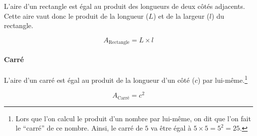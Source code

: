 \documentclass[a4paper, twoside]{article}
\begin{document}
L'aire d'un rectangle est égal au produit des longueurs de deux
côtés adjacents. Cette aire vaut donc le produit de la
longueur ($L$) et de la largeur ($l$) du rectangle.

$$A_{\text{Rectangle}} = L \times l$$

\vspace*{-0.25cm}

\paragraph*{Carré}

L'aire d'un carré est égal au produit de la longueur d'un côté
($c$) par lui-même.\footnote{Lors que l'on calcul le produit d'un nombre
	par lui-même, on dit que l'on fait le “carré” de ce nombre.
	Ainsi, le carré de $5$ va être égal à $5 \times 5 = 5^{2} = 25$.}

$$A_{\text{Carré}} = c^{2}$$

\newlength{\hauteurImage}
\setlength{\hauteurImage}{3.5cm}
\end{document}
